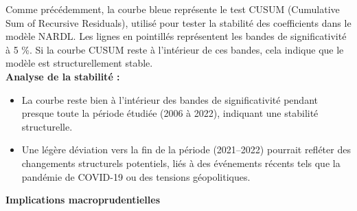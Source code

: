 Comme précédemment, la courbe bleue représente le test CUSUM (Cumulative Sum of Recursive Residuals), utilisé pour tester la stabilité des coefficients dans le modèle NARDL. Les lignes en pointillés représentent les bandes de significativité à 5 \%. Si la courbe CUSUM reste à l'intérieur de ces bandes, cela indique que le modèle est structurellement stable.\\

\textbf{Analyse de la stabilité :}
\begin{itemize}
    \item La courbe reste bien à l'intérieur des bandes de significativité pendant presque toute la période étudiée (2006 à 2022), indiquant une stabilité structurelle.
    \item Une légère déviation vers la fin de la période (2021–2022) pourrait refléter des changements structurels potentiels, liés à des événements récents tels que la pandémie de COVID-19 ou des tensions géopolitiques.
\end{itemize}

\vspace{0.5cm}

\textbf{Implications macroprudentielles} \\

